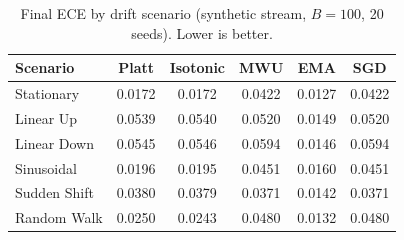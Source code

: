 \begin{table}[H]
\centering
\begin{tabular}{@{}lccccc@{}}
\toprule
Scenario & Platt & Isotonic & MWU & EMA & SGD\\
\midrule
Stationary & 0.0172 & 0.0172 & 0.0422 & 0.0127 & 0.0422\\
Linear Up & 0.0539 & 0.0540 & 0.0520 & 0.0149 & 0.0520\\
Linear Down & 0.0545 & 0.0546 & 0.0594 & 0.0146 & 0.0594\\
Sinusoidal & 0.0196 & 0.0195 & 0.0451 & 0.0160 & 0.0451\\
Sudden Shift & 0.0380 & 0.0379 & 0.0371 & 0.0142 & 0.0371\\
Random Walk & 0.0250 & 0.0243 & 0.0480 & 0.0132 & 0.0480\\
\bottomrule
\end{tabular}
\caption{Final ECE by drift scenario (synthetic stream, $B=100$, 20 seeds). Lower is better.}
\label{tab:drift_scenarios}
\end{table}
